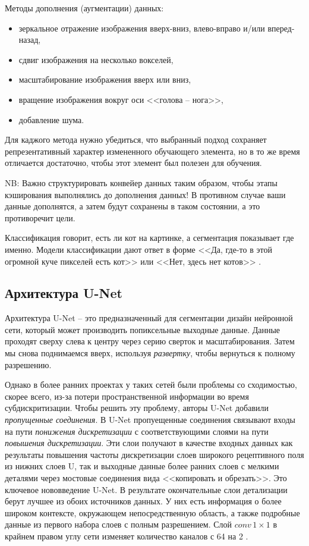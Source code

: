 \documentclass[%
	11pt,
	a4paper,
	utf8,
		]{article}
\begin{document}
Методы дополнения (аугментации) данных:
\begin{itemize}
	\item зеркальное отражение изображения вверх-вниз, влево-вправо и/или вперед-назад,
	
	\item сдвиг изображения на несколько вокселей,
	
    \item масштабирование изображения вверх или вниз,
    
    \item вращение изображения вокруг оси <<голова -- нога>>,
    
    \item добавление шума.
\end{itemize}

Для каджого метода нужно убедиться, что выбранный подход сохраняет репрезентативный характер измененного обучающего элемента, но в то же время отличается достаточно, чтобы этот элемент был полезен для обучения.

NB: Важно структурировать конвейер данных таким образом, чтобы этапы кэширования выполнялись до дополнения данных! В противном случае ваши данные дополнятся, а затем будут сохранены в таком состоянии, а это противоречит цели.

Классификация говорит, есть ли кот на картинке, а сегментация показывает где именно. Модели классификации дают ответ в форме <<Да, где-то в этой огромной куче пикселей есть кот>> или <<Нет, здесь нет котов>> \cite[]{pytorch-2022}.

\subsection{Архитектура U-Net}

Архитектура U-Net -- это предназначенный для сегментации дизайн нейронной сети, который может производить попиксельные выходные данные. Данные проходят сверху слева к центру через серию сверток и масштабирования. Затем мы снова поднимаемся вверх, используя \emph{развертку}, чтобы вернуться к полному разрешению.

Однако в более ранних проектах у таких сетей были проблемы со сходимостью, скорее всего, из-за потери пространственной информации во время субдискритизации. Чтобы решить эту проблему, авторы U-Net добавили \emph{пропущенные соединения}. В U-Net пропуещенные соединения связывают входы на пути \emph{понижения дискретизации} с соответствующими слоями на пути \emph{повышения дискретизации}. Эти слои получают в качестве входных данных как результаты повышения частоты дискретизации слоев широкого рецептивного поля из нижних слоев U, так и выходные данные более ранних слоев с мелкими деталями через мостовые соединения вида <<копировать и обрезать>>. Это ключевое нововведение U-Net. В результате окончательные слои детализации берут лучшее из обоих источников данных. У них есть информация о более широком контексте, окружающем непосредственную область, а также подробные данные из первого набора слоев с полным разрешением. Слой $conv \, 1 \times 1$ в крайнем правом углу сети изменяет количество каналов с 64 на 2 \cite[]{pytorch-2022}.
\end{document}
